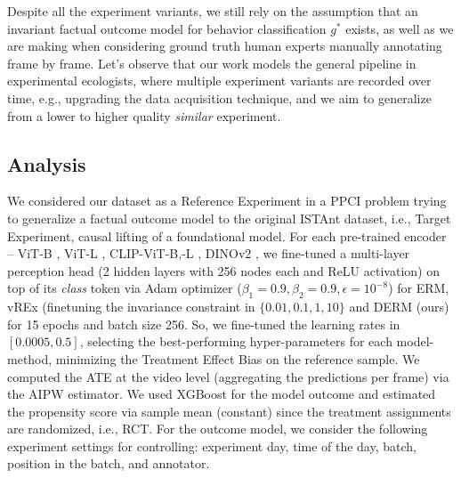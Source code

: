 
Despite all the experiment variants, we still rely on the assumption that an invariant factual outcome model for behavior classification $g^*$ exists, as well as we are making when considering ground truth human experts manually annotating frame by frame.
Let's observe that our work models the general pipeline in experimental ecologists, where multiple experiment variants are recorded over time, e.g., upgrading the data acquisition technique, and we aim to generalize from a lower to higher quality \textit{similar} experiment. 

\subsection{Analysis}
\label{ssec:ISTAexp}
We considered our dataset as a Reference Experiment in a PPCI problem trying to generalize a factual outcome model to the original ISTAnt dataset, i.e., Target Experiment, causal lifting of a foundational model.
For each pre-trained encoder -- ViT-B \citep{dosovitskiy2020image}, ViT-L \citep{zhai2023sigmoid}, CLIP-ViT-B,-L \citep{radford2021learning}, DINOv2 \citep{oquab2023dinov2}, we fine-tuned a multi-layer perception head (2 hidden layers with 256 nodes each and ReLU activation) on top of its \textit{class} token via Adam optimizer ($\beta_1=0.9, \beta_2=0.9,  \epsilon=10^{-8}$) for ERM, vREx (finetuning the invariance constraint in $\{0.01,0.1,1,10\}$ and DERM (ours) for 15 epochs and batch size 256. So, we fine-tuned the learning rates in $[0.0005, 0.5]$, selecting the best-performing hyper-parameters for each model-method, minimizing the Treatment Effect Bias on the reference sample. 
We computed the ATE at the video level (aggregating the predictions per frame) via the AIPW estimator. We used XGBoost for the model outcome and estimated the propensity score via sample mean (constant) since the treatment assignments are randomized, i.e., RCT. For the outcome model, we consider the following experiment settings for controlling: experiment day, time of the day, batch, position in the batch, and annotator.



